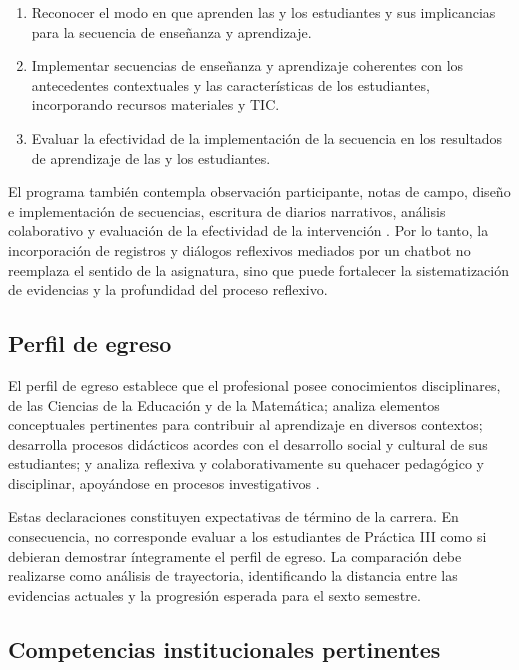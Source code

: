 \documentclass[11pt,a4paper]{article}
\begin{document}
\begin{enumerate}
    \item Reconocer el modo en que aprenden las y los estudiantes y sus implicancias para la secuencia de enseñanza y aprendizaje.
    \item Implementar secuencias de enseñanza y aprendizaje coherentes con los antecedentes contextuales y las características de los estudiantes, incorporando recursos materiales y TIC.
    \item Evaluar la efectividad de la implementación de la secuencia en los resultados de aprendizaje de las y los estudiantes.
\end{enumerate}

El programa también contempla observación participante, notas de campo, diseño e implementación de secuencias, escritura de diarios narrativos, análisis colaborativo y evaluación de la efectividad de la intervención \cite{practicaIII}. Por lo tanto, la incorporación de registros y diálogos reflexivos mediados por un chatbot no reemplaza el sentido de la asignatura, sino que puede fortalecer la sistematización de evidencias y la profundidad del proceso reflexivo.

\subsection{Perfil de egreso}

El perfil de egreso establece que el profesional posee conocimientos disciplinares, de las Ciencias de la Educación y de la Matemática; analiza elementos conceptuales pertinentes para contribuir al aprendizaje en diversos contextos; desarrolla procesos didácticos acordes con el desarrollo social y cultural de sus estudiantes; y analiza reflexiva y colaborativamente su quehacer pedagógico y disciplinar, apoyándose en procesos investigativos \cite{perfil}.

Estas declaraciones constituyen expectativas de término de la carrera. En consecuencia, no corresponde evaluar a los estudiantes de Práctica III como si debieran demostrar íntegramente el perfil de egreso. La comparación debe realizarse como análisis de trayectoria, identificando la distancia entre las evidencias actuales y la progresión esperada para el sexto semestre.

\subsection{Competencias institucionales pertinentes}
\end{document}
